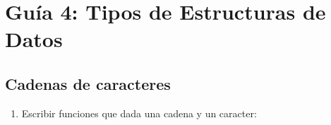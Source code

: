 \documentclass[
  letterpaper,
  DIV=11,
  numbers=noendperiod]{scrreprt}
\begin{document}
\section*{Guía 4: Tipos de Estructuras de
Datos}\label{guuxeda-4-tipos-de-estructuras-de-datos}


\subsection*{Cadenas de caracteres}\label{cadenas-de-caracteres-1}

\begin{enumerate}
\def\labelenumi{\arabic{enumi}.}
\item
  Escribir funciones que dada una cadena y un caracter:


\end{enumerate}
\end{document}
